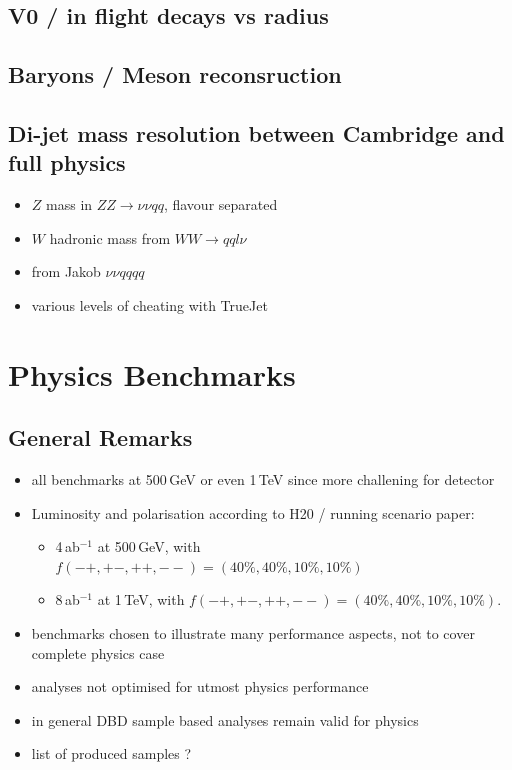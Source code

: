 \subsection{V0 / in flight decays vs radius}
\subsection{Baryons / Meson reconsruction}
\subsection{Di-jet mass resolution between Cambridge and full physics}
\begin{itemize}
\item $Z$ mass in $ZZ \to \nu\nu qq$, flavour separated
\item $W$ hadronic mass from $WW \to qq l\nu$
\item from Jakob $\nu\nu qqqq$
\item various levels of cheating with TrueJet
\end{itemize}


\section{Physics Benchmarks}
\subsection{General Remarks}
\begin{itemize}
\item all benchmarks at 500\,GeV or even 1\,TeV since more challening for detector
\item Luminosity and polarisation according to H20 / running scenario paper: 
  \begin{itemize}
   \item 4\,ab$^{-1}$ at 500\,GeV, with $f(-+,+-,++,--) = (40\%,40\%, 10\%, 10\%)$
   \item 8\,ab$^{-1}$ at 1\,TeV, with $f(-+,+-,++,--) = (40\%,40\%, 10\%, 10\%)$.
\end{itemize}
\item benchmarks chosen to illustrate many performance aspects, not to cover complete physics case
\item analyses not optimised for utmost physics performance
\item in general DBD sample based analyses remain valid for physics
\item list of produced samples ?
\end{itemize}

